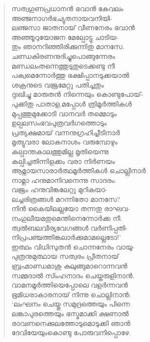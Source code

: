 \begin{verse}
സത്വഗുണപ്രധാനന്‍ ഭവാന്‍ കേവലം\\
അഞ്ജനാഗര്‍ഭച്യുതനായവനിയി-\\
ലഞ്ജസാ ജാതനായ് വീണനേരം ഭവാന്‍\\
അഞ്ഞൂറുയോജന മേല്പോട്ടു ചാടിയ-\\
തും ഞാനറിഞ്ഞിരിക്കുന്നിതു മാനസേ.\\
ചണ്ഡകിരണനുദിച്ചുപൊങ്ങുന്നേരം\\
മണ്ഡലംതന്നെത്തുടുതുടെക്കണ്ടു നീ\\
പക്വമെന്നോര്‍ത്തു ഭക്ഷിപ്പാനടുക്കയാല്‍\\
ശക്രനുടെ വജ്രമേറ്റു പതിച്ചതും\\
ദുഃഖിച്ചു മാരുതന്‍ നിന്നെയും കൊണ്ടുപോയ്-\\
പുക്കിതു പാതാള,മപ്പോള്‍ ത്രിമൂര്‍ത്തികള്‍\\
മുപ്പത്തുമുക്കോടി വാനവര്‍ തമ്മൊടും\\
ഉല്പലസംഭവപുത്രവര്‍ഗത്തൊടും\\
പ്രത്യക്ഷമായ് വന്നനുഗ്രഹിച്ചീടിനാര്‍\\
മൃത്യുവരാ ലോകനാശം വരുമ്പോഴും\\
കല്പാന്തകാലത്തുമില്ല മൃതിയെന്നു\\
കല്പിച്ചതിന്നിളക്കം വരാ നിര്‍ണയം\\
ആമ്നായസാരാര്‍ത്ഥമൂര്‍ത്തികള്‍ ചൊല്ലിനാര്‍\\
നാമ്നാ ഹനുമാനിവനെന്നു സാദരം.\\
വജ്രം ഹനുവിങ്കലേറ്റു മുറികയാ-\\
ലച്ചരിത്രങ്ങള്‍ മറന്നിതോ മാനസേ?\\
നിന്‍ കൈയിലല്ലയോ തന്നതു രാഘവ-\\
നംഗുലീയമതുമെന്തിനെന്നോര്‍ക്ക നീ.\\
ത്വല്‍ബലവീര്യവേഗങ്ങള്‍ വര്‍ണിപ്പതി-\\
നിപ്രപഞ്ചത്തിങ്കലാര്‍ക്കുമാമല്ലെടോ!’\\
ഇത്ഥം വിധിസുതന്‍ ചൊന്നനേരം വായു-\\
പുത്രനുമുത്ഥായ സത്വരം പ്രീതനായ്\\
ബ്രഹ്മാണ്ഡമാശു കുലുങ്ങുമാറൊന്നവന്‍\\
സമ്മദാല്‍ സിംഹനാദം ചെയ്തരുളിനാന്‍.\\
വാമനമൂര്‍ത്തിയെപ്പോലെ വളര്‍ന്നവന്‍\\
ഭൂമിധരാകാരനായ് നിന്നു ചൊല്ലിനാന്‍:\\
‘ലംഘനം ചെയ്തു സമുദ്രത്തെയും പിന്നെ\\
ലങ്കാപുരത്തെയും ഭസ്മമാക്കി ക്ഷണാല്‍\\
രാവണനെക്കുലത്തോടുമൊടുക്കി ഞാന്‍\\
ദേവിയേയുംകൊണ്ടു പോരുവനിപ്പൊഴേ.\\

\end{verse}
